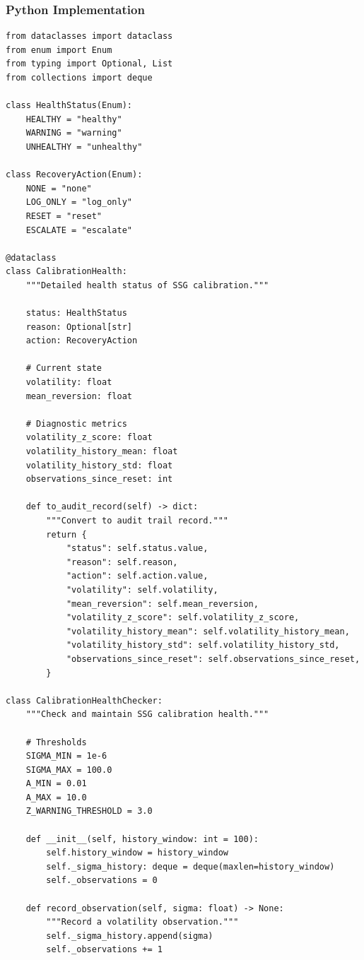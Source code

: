 \subsubsection{Python Implementation}

\begin{lstlisting}[language=jsonx,caption={Calibration health check implementation}]
from dataclasses import dataclass
from enum import Enum
from typing import Optional, List
from collections import deque

class HealthStatus(Enum):
    HEALTHY = "healthy"
    WARNING = "warning"
    UNHEALTHY = "unhealthy"

class RecoveryAction(Enum):
    NONE = "none"
    LOG_ONLY = "log_only"
    RESET = "reset"
    ESCALATE = "escalate"

@dataclass
class CalibrationHealth:
    """Detailed health status of SSG calibration."""
    
    status: HealthStatus
    reason: Optional[str]
    action: RecoveryAction
    
    # Current state
    volatility: float
    mean_reversion: float
    
    # Diagnostic metrics
    volatility_z_score: float
    volatility_history_mean: float
    volatility_history_std: float
    observations_since_reset: int
    
    def to_audit_record(self) -> dict:
        """Convert to audit trail record."""
        return {
            "status": self.status.value,
            "reason": self.reason,
            "action": self.action.value,
            "volatility": self.volatility,
            "mean_reversion": self.mean_reversion,
            "volatility_z_score": self.volatility_z_score,
            "volatility_history_mean": self.volatility_history_mean,
            "volatility_history_std": self.volatility_history_std,
            "observations_since_reset": self.observations_since_reset,
        }

class CalibrationHealthChecker:
    """Check and maintain SSG calibration health."""
    
    # Thresholds
    SIGMA_MIN = 1e-6
    SIGMA_MAX = 100.0
    A_MIN = 0.01
    A_MAX = 10.0
    Z_WARNING_THRESHOLD = 3.0
    
    def __init__(self, history_window: int = 100):
        self.history_window = history_window
        self._sigma_history: deque = deque(maxlen=history_window)
        self._observations = 0
    
    def record_observation(self, sigma: float) -> None:
        """Record a volatility observation."""
        self._sigma_history.append(sigma)
        self._observations += 1
    

\end{lstlisting}
